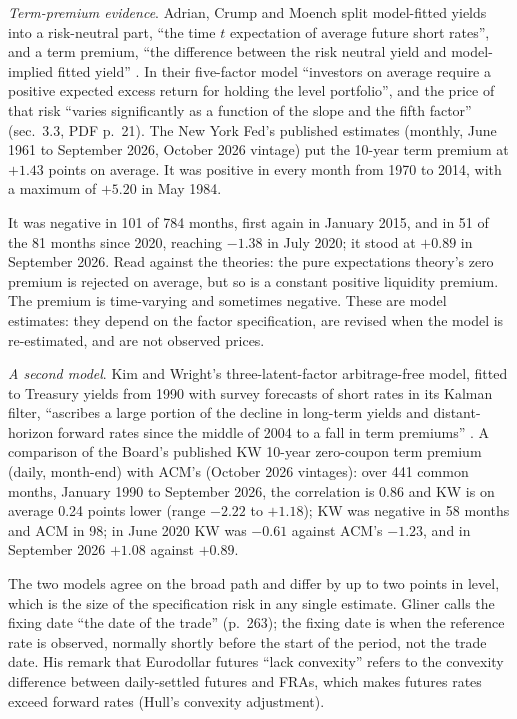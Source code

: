 \begin{qfmodel}
\emph{Term-premium evidence}. Adrian, Crump and Moench split model-fitted yields into a risk-neutral part, ``the time $t$ expectation of average future short rates'', and a term premium, ``the difference between the risk neutral yield and model-implied fitted yield'' \citep[Staff Report 340, rev.\ April 2013, sec.~2.4, PDF p.~12]{exp-adrian-crump-moench-term-structure}. In their five-factor model ``investors on average require a positive expected excess return for holding the level portfolio'', and the price of that risk ``varies significantly as a function of the slope and the fifth factor'' (sec.~3.3, PDF p.~21). The New York Fed's published estimates (monthly, June 1961 to September 2026, October 2026 vintage) put the 10-year term premium at $+1.43$ points on average. It was positive in every month from 1970 to 2014, with a maximum of $+5.20$ in May 1984.

It was negative in 101 of 784 months, first again in January 2015, and in 51 of the 81 months since 2020, reaching $-1.38$ in July 2020; it stood at $+0.89$ in September 2026. Read against the theories: the pure expectations theory's zero premium is rejected on average, but so is a constant positive liquidity premium. The premium is time-varying and sometimes negative. These are model estimates: they depend on the factor specification, are revised when the model is re-estimated, and are not observed prices.

\emph{A second model}. Kim and Wright's three-latent-factor arbitrage-free model, fitted to Treasury yields from 1990 with survey forecasts of short rates in its Kalman filter, ``ascribes a large portion of the decline in long-term yields and distant-horizon forward rates since the middle of 2004 to a fall in term premiums'' \citep[FEDS 2005-33, abstract and sec.~2, PDF pp.~2--12]{rt-kim-wright-2005}. A comparison of the Board's published KW 10-year zero-coupon term premium (daily, month-end) with ACM's (October 2026 vintages): over 441 common months, January 1990 to September 2026, the correlation is 0.86 and KW is on average 0.24 points lower (range $-2.22$ to $+1.18$); KW was negative in 58 months and ACM in 98; in June 2020 KW was $-0.61$ against ACM's $-1.23$, and in September 2026 $+1.08$ against $+0.89$.

The two models agree on the broad path and differ by up to two points in level, which is the size of the specification risk in any single estimate. Gliner calls the fixing date ``the date of the trade'' (p.~263); the fixing date is when the reference rate is observed, normally shortly before the start of the period, not the trade date. His remark that Eurodollar futures ``lack convexity'' refers to the convexity difference between daily-settled futures and FRAs, which makes futures rates exceed forward rates (Hull's convexity adjustment).


\end{qfmodel}

